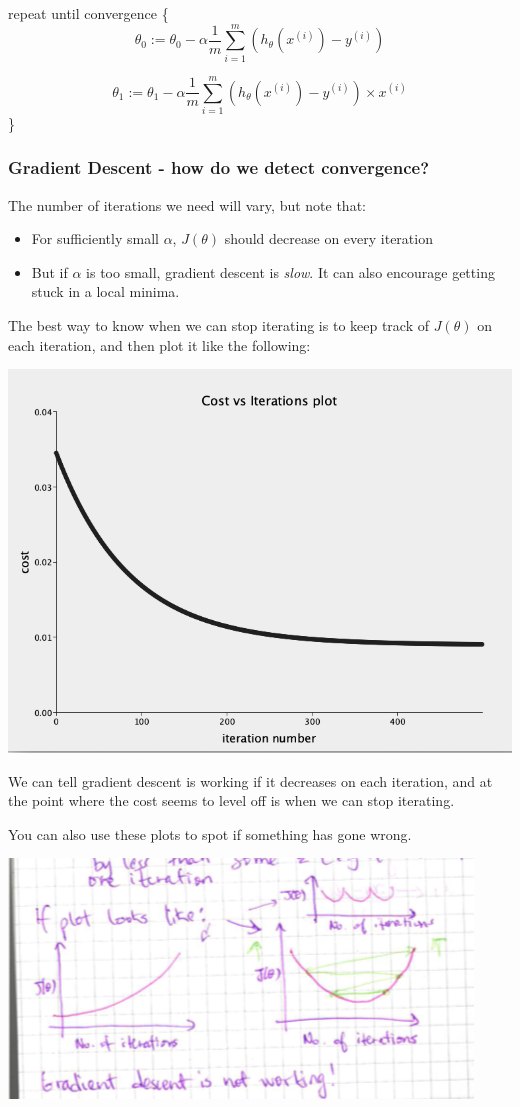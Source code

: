 \documentclass[12pt]{article}
\begin{document}
repeat until convergence \{
\[\theta_0 := \theta_0 - \alpha \frac{1}{m} \sum^m_{i=1} (h_\theta(x^{(i)}) - y^{(i)} )\]

\[\theta_1 := \theta_1 - \alpha \frac{1}{m} \sum^m_{i=1} (h_\theta(x^{(i)}) - y^{(i)}) \times x^{(i)}\]
\}

\subsubsection{Gradient Descent - how do we detect convergence?}

The number of iterations we need will vary, but note that:
\begin{itemize}
\item For sufficiently small $\alpha$, $J(\theta)$ should decrease on every iteration
\item But if $\alpha$ is too small, gradient descent is \textit{slow}. It can also encourage getting stuck in a local minima. 
\end{itemize}

The best way to know when we can stop iterating is to keep track of $J(\theta)$ on each iteration, and then plot it like the following:

\includegraphics[width={\textwidth}]{cost-iterations}

We can tell gradient descent is working if it decreases on each iteration, and at the point where the cost seems to level off is when we can stop iterating. 

You can also use these plots to spot if something has gone wrong. 

\includegraphics[width={\textwidth}]{not-working}
\end{document}
